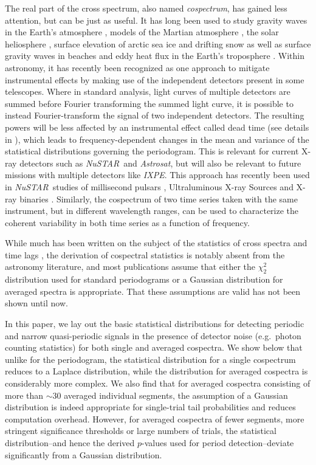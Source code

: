 \documentclass[12pt]{emulateapj}
\newcommand{\project}[1]{\textsl{#1}}
\newcommand{\nustar}{\project{NuSTAR}\xspace}
\newcommand{\astrosat}{\project{Astrosat}\xspace}
\newcommand{\ixpe}{\project{IXPE}\xspace}
\begin{document}
The real part of the cross spectrum, also named \textit{cospectrum}, has gained less attention, but can be just as useful. It has long been used to study gravity waves in the Earth's atmosphere \citep[e.g.][]{john2016}, models of the Martian atmosphere \citep[e.g.][]{wang2016}, the solar heliosphere \citep[e.g.][]{vigeesh2017}, surface elevation of arctic sea ice \citep[e.g.][]{ardhuin2016} and drifting snow \citep[e.g.][]{paterna2016} as well as surface gravity waves in beaches \citep[e.g.][]{fiedler2015} and eddy heat flux in the Earth's troposphere \citep[e.g.][]{wang2015,zurita-gotor2017}.
Within astronomy, it has recently been recognized as one approach to mitigate instrumental effects by making use of the independent detectors present in some telescopes. Where in standard analysis, light curves of multiple detectors are summed before Fourier transforming the summed light curve, it is possible to instead Fourier-transform the signal of two independent detectors. 
The resulting powers will be less affected by an instrumental effect called dead time (see details in \citealt{Bachetti+15}), which leads to frequency-dependent changes in the mean and variance of the statistical distributions governing the periodogram. This is relevant for current X-ray detectors such as \nustar\ and \astrosat, but will also be relevant to future missions with multiple detectors like \ixpe. This approach has recently been used in \nustar\ studies of millisecond pulsars \citep{ferrigno2017}, Ultraluminous X-ray Sources \citep{bachetti2016} and X-ray binaries \citep{barriere2015,zoghbi2016,ingram2016,huppenkothen2017,stiele2017}.
Similarly, the cospectrum of two time series taken with the same instrument, but in different wavelength ranges, can be used to characterize the coherent variability in both time series as a function of frequency.

While much has been written on the subject of the statistics of cross spectra and time lags \citep[e.g.][]{epitropakis2016}, the derivation of cospectral statistics is notably absent from the astronomy literature, and most publications assume that either the $\chi^2_2$ distribution used for standard periodograms or a Gaussian distribution for averaged spectra is appropriate. That these assumptions are valid has not been shown until now. 

In this paper, we lay out the basic statistical distributions for detecting periodic and narrow quasi-periodic signals in the presence of detector noise (e.g.\ photon counting statistics) for both single and averaged cospectra. We show below that unlike for the periodogram, the statistical distribution for a single cospectrum reduces to a Laplace distribution, while the distribution for averaged cospectra is considerably more complex. We also find that for averaged cospectra consisting of more than $\sim$30 averaged individual segments, the assumption of a Gaussian distribution is indeed appropriate for single-trial tail probabilities and reduces computation overhead. However, for averaged cospectra of fewer segments, more stringent significance thresholds or large numbers of trials, the statistical distribution--and hence the derived $p$-values used for period detection--deviate significantly from a Gaussian distribution.
\end{document}
